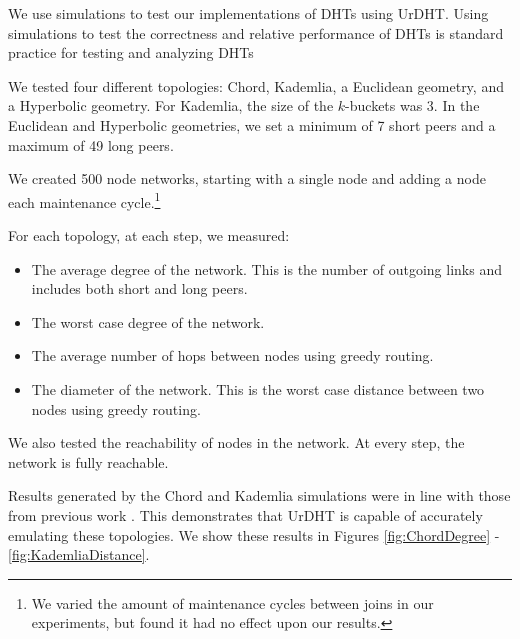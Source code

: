 We use simulations to test our implementations of DHTs using UrDHT.
Using simulations to test the correctness and relative performance of DHTs is standard practice for testing and analyzing DHTs \cite{kademlia} \cite{symphony} \cite{chord}  \cite{tapestry}  \cite{raynet}

%
%
%
%

We tested four different topologies: Chord, Kademlia, a Euclidean geometry, and a Hyperbolic geometry.
For Kademlia, the size of the $k$-buckets was 3.
In the Euclidean and Hyperbolic geometries, we set a minimum of 7 short peers and a maximum of 49 long peers.

We created 500 node networks, starting with a single node and adding a node each maintenance cycle.\footnote{We varied the amount of maintenance cycles between joins in our experiments, but found it had no effect upon our results.}

For each topology, at each step, we measured:
\begin{itemize}
	\item The average degree of the network.  This is the  number of outgoing links and includes both short and long peers.
	\item The worst case degree of the network.
	\item The average number of hops between nodes using greedy routing.
	\item The diameter of the network.  
	This is the worst case distance between two nodes using greedy routing.
\end{itemize}

We also tested the reachability of nodes in the network.
At every step, the network is fully reachable.

Results generated by the Chord and Kademlia simulations were in line with those from previous work  \cite{kademlia} \cite{chord}.
This demonstrates that UrDHT is capable of accurately emulating these topologies.
We show these results in Figures \ref{fig:ChordDegree} - \ref{fig:KademliaDistance}.




